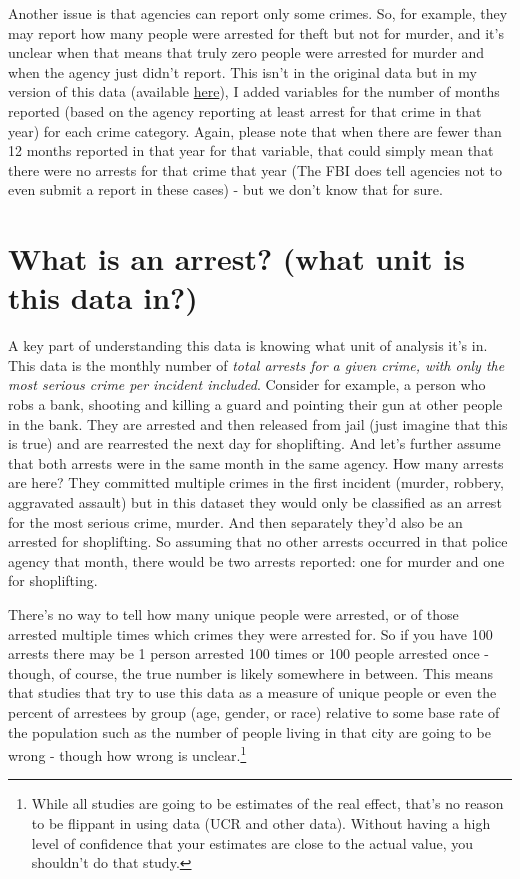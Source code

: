 \documentclass[
  12pt,
  openany]{book}
\begin{document}
Another issue is that agencies can report only some crimes. So, for example, they may report how many people were arrested for theft but not for murder, and it's unclear when that means that truly zero people were arrested for murder and when the agency just didn't report. This isn't in the original data but in my version of this data (available \href{https://www.openicpsr.org/openicpsr/project/102263/version/V12/view}{here}), I added variables for the number of months reported (based on the agency reporting at least arrest for that crime in that year) for each crime category. Again, please note that when there are fewer than 12 months reported in that year for that variable, that could simply mean that there were no arrests for that crime that year (The FBI does tell agencies not to even submit a report in these cases) - but we don't know that for sure.

\hypertarget{what-is-an-arrest-what-unit-is-this-data-in}{%
\section{What is an arrest? (what unit is this data in?)}\label{what-is-an-arrest-what-unit-is-this-data-in}}

A key part of understanding this data is knowing what unit of analysis it's in. This data is the monthly number of \emph{total arrests for a given crime, with only the most serious crime per incident included}. Consider for example, a person who robs a bank, shooting and killing a guard and pointing their gun at other people in the bank. They are arrested and then released from jail (just imagine that this is true) and are rearrested the next day for shoplifting. And let's further assume that both arrests were in the same month in the same agency. How many arrests are here? They committed multiple crimes in the first incident (murder, robbery, aggravated assault) but in this dataset they would only be classified as an arrest for the most serious crime, murder. And then separately they'd also be an arrested for shoplifting. So assuming that no other arrests occurred in that police agency that month, there would be two arrests reported: one for murder and one for shoplifting.

There's no way to tell how many unique people were arrested, or of those arrested multiple times which crimes they were arrested for. So if you have 100 arrests there may be 1 person arrested 100 times or 100 people arrested once - though, of course, the true number is likely somewhere in between. This means that studies that try to use this data as a measure of unique people or even the percent of arrestees by group (age, gender, or race) relative to some base rate of the population such as the number of people living in that city are going to be wrong - though how wrong is unclear.\footnote{While all studies are going to be estimates of the real effect, that's no reason to be flippant in using data (UCR and other data). Without having a high level of confidence that your estimates are close to the actual value, you shouldn't do that study.}
\end{document}
